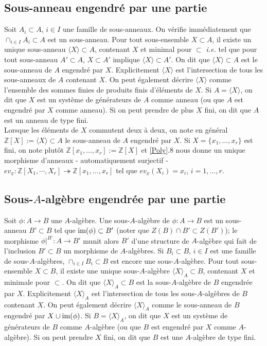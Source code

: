 \documentclass[a4paper, 12pt]{amsart}
\newcommand{\Z}{\mathbb{Z}}
\begin{document}
  \subsection{Sous-anneau engendr\'e par une partie} Soit  $A_i\subset A$, $i\in I$ une famille de sous-anneaux. On v\'erifie imm\'ediatement que $\cap_{i\in I}A_i\subset A$ est un sous-anneau. Pour tout sous-ensemble $X\subset A$, il existe 
un unique sous-anneau $\langle X\rangle \subset A$, contenant $X$ et minimal pour $\subset$ \textit{i.e.} tel que pour  tout sous-anneau $A'\subset A$,   $X\subset A'$ implique  $\langle X\rangle\subset A'$. On dit que $\langle X\rangle\subset A$ est le sous-anneau de $A$ engendr\'e par $X$.  Explicitement $\langle X\rangle$ est l'intersection de tous les sous-anneaux de $A$ contenant $X$. On peut \'egalement d\'ecrire $\langle X\rangle$ comme  l'ensemble des sommes finies de produits finis d'\'el\'ements de $X$. Si $A=\langle X\rangle$, on dit que $X$ est un syst\`eme de g\'en\'erateurs de $A$ comme anneau (ou que $A$ est engendr\'e par $X$ comme anneau). Si on peut prendre de plus $X$ fini, on dit que $A$ est un anneau de type fini.\\

\noindent Lorsque les \'el\'ements de $X$ commutent deux \`a deux, on note en g\'en\'eral $\Z[X]:=\langle X\rangle \subset A$ le sous-anneau de $A$ engendr\'e par $X$. Si  $X=\lbrace x_1,\dots,x_r\rbrace $ est fini, on note plut\^ot $\Z[x_1,\dots,x_r]:=\Z[X]$ et \ref{Poly}.8  nous donne un unique morphisme d'anneaux - automatiquement  surjectif - $ev_{\underline{x}}:\Z[X_1,\cdots, X_r]\twoheadrightarrow \Z[x_1,\dots,x_r] $ tel que $ev_{\underline{x}}(X_i)=x_i$, $i=1,\dots, r$.   \\
 
  \subsection{Sous-$A$-alg\`ebre engendr\'ee par une partie}\label{SousAlg} Soit $\phi:A\rightarrow B$ une $A$-alg\`ebre. Une sous-$A$-alg\`ebre de $\phi:A\rightarrow B$ est un sous-anneau $B'\subset B$ tel que $\hbox{\rm im}(\phi)\subset B'$ (noter que $Z(B)\cap B'\subset Z(B')$); le morphisme $\phi|^{B'}:A\rightarrow B'$ munit alors $B'$ d'une structure de $A$-alg\`ebre qui fait de l'inclusion $B'\subset B$ un morphisme de $A$-alg\`ebres. Si    $B_i\subset B$, $i\in I$ est une famille de sous-$A$-alg\`ebres, $\cap_{i\in I}B_i\subset B$  est encore une sous-$A$-alg\`ebre. Pour tout sous-ensemble $X\subset B$, il existe 
une unique sous-$A$-alg\`ebre $\langle X\rangle_A \subset B$, contenant $X$ et minimale pour $\subset$. On dit que $\langle X\rangle_A\subset B$ est la sous-$A$-alg\`ebre de $B$ engendr\'ee par $X$. Explicitement $\langle X\rangle_A$ est l'intersection de tous les sous-$A$-alg\`ebres de $B$ contenant $X$. On peut \'egalement d\'ecrire $\langle X\rangle_A$ comme  le sous-anneau de $B$ engendr\'e par $X\cup\hbox{\rm im}(\phi)$. Si $B=\langle X\rangle_A$, on dit que $X$ est un syst\`eme de g\'en\'erateurs de $B$ comme $A$-alg\`ebre (ou que $B$ est engendr\'e par $X$ comme $A$-alg\`ebre). Si on peut prendre $X$ fini, on dit que $B$ est une $A$-alg\`ebre de type fini.\\
\end{document}
